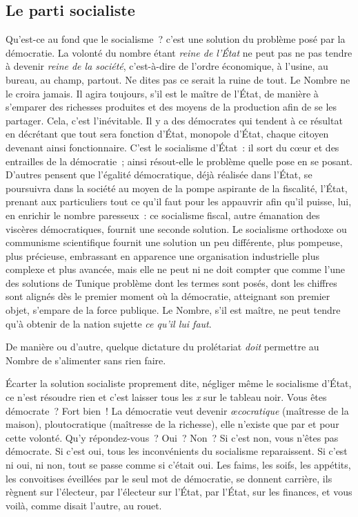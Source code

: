 \documentclass[french,twoside]{book} %
\begin{document}
\subsection[Le parti socialiste]{Le parti socialiste}
\noindent Qu’est-ce au fond que le socialisme ? c’est une solution du problème posé par la démocratie. La volonté du nombre étant \emph{reine de l’État} ne peut pas ne pas tendre à devenir \emph{reine de la société}, c’est-à-dire de l’ordre économique, à l’usine, au bureau, au champ, partout. Ne dites pas ce serait la ruine de tout. Le Nombre ne le croira jamais. Il agira toujours, s’il est le maître de l’État, de manière à s’emparer des richesses produites et des moyens de la production afin de se les partager. Cela, c’est l’inévitable. Il y a des démocrates qui tendent à ce résultat en décrétant que tout sera fonction d’État, monopole d’État, chaque citoyen devenant ainsi fonctionnaire. C’est le socialisme d’État : il sort du cœur et des entrailles de la démocratie ; ainsi résout-elle le problème quelle pose en se posant. D’autres pensent que l’égalité démocratique, déjà réalisée dans l’État, se poursuivra dans la société au moyen de la pompe aspirante de la fiscalité, l’État, prenant aux particuliers tout ce qu’il faut pour les appauvrir afin qu’il puisse, lui, en enrichir le nombre paresseux : ce socialisme fiscal, autre émanation des viscères démocratiques, fournit une seconde solution. Le socialisme orthodoxe ou communisme scientifique fournit une solution un peu différente, plus pompeuse, plus précieuse, embrassant en apparence une organisation industrielle plus complexe et plus avancée, mais elle ne peut ni ne doit compter que comme l’une des solutions de Tunique problème dont les termes sont posés, dont les chiffres sont alignés dès le premier moment où la démocratie, atteignant son premier objet, s’empare de la force publique. Le Nombre, s’il est maître, ne peut tendre qu’à obtenir de la nation sujette \emph{ce qu’il lui faut}.\par
De manière ou d’autre, quelque dictature du prolétariat \emph{doit} permettre au Nombre de s’alimenter sans rien faire.\par
Écarter la solution socialiste proprement dite, négliger même le socialisme d’État, ce n’est résoudre rien et c’est laisser tous les \emph{x} sur le tableau noir. Vous êtes démocrate ? Fort bien ! La démocratie veut devenir \emph{œcocratique} (maîtresse de la maison), ploutocratique (maîtresse de la richesse), elle n’existe que par et pour cette volonté. Qu’y répondez-vous ? Oui ? Non ? Si c’est non, vous n’êtes pas démocrate. Si c’est oui, tous les inconvénients du socialisme reparaissent. Si c’est ni oui, ni non, tout se passe comme si c’était oui. Les faims, les soifs, les appétits, les convoitises éveillées par le seul mot de démocratie, se donnent carrière, ils règnent sur l’électeur, par l’électeur sur l’État, par l’État, sur les finances, et vous voilà, comme disait l’autre, au rouet.\par
\end{document}
